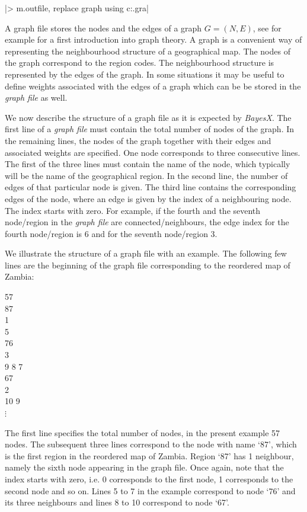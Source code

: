 |> m.outfile, replace graph using c:\data\zambiasort.gra|

A graph file stores the nodes and the edges of a graph $G = (N,E)$, see for example  for a first
introduction into graph theory. A graph is a convenient way of representing the neighbourhood structure of a geographical map.
The nodes of the graph correspond to the region codes. The neighbourhood structure is represented by the edges of the graph. In
some situations it may be useful to define weights associated with the edges of a graph which can be be stored in the {\it
graph file} as well.

We now describe the structure of a graph file as it is expected by {\it BayesX}. The first line of a {\it graph file} must
contain the total number of nodes of the graph. In the remaining lines, the nodes of the graph together with their edges and
associated weights are specified. One node corresponds to three consecutive lines. The first of the three lines must contain
the name of the node, which typically will be the name of the geographical region. In the second line, the number of edges of
that particular node is given. The third line contains the corresponding edges of the node, where an edge is given by the index
of a neighbouring node. The index starts with zero. For example, if the fourth and the seventh node/region in the {\it graph
file} are connected/neighbours, the edge index for the fourth node/region is 6 and for the seventh node/region 3.

We illustrate the structure of a graph file with an example. The following few lines are the beginning of the graph file
corresponding to the reordered map of Zambia:

\footnotesize

 57\\
 87\\
 1\\
 5\\
 76\\
 3\\
 9 8 7\\
 67\\
 2\\
 10 9\\

\hspace{1cm} $\vdots$

\normalsize

\vspace{0.5cm}

The first line specifies the total number of nodes, in the present example 57 nodes. The subsequent three lines correspond to
the node with name `87', which is the first region in the reordered map of Zambia. Region `87' has 1 neighbour, namely the
sixth node appearing in the graph file. Once again, note that the index starts with zero, i.e. 0 corresponds to the first node,
1 corresponds to the second node and so on. Lines 5 to 7 in the example correspond to node `76' and its three neighbours and
lines 8 to 10 correspond to node `67'.

